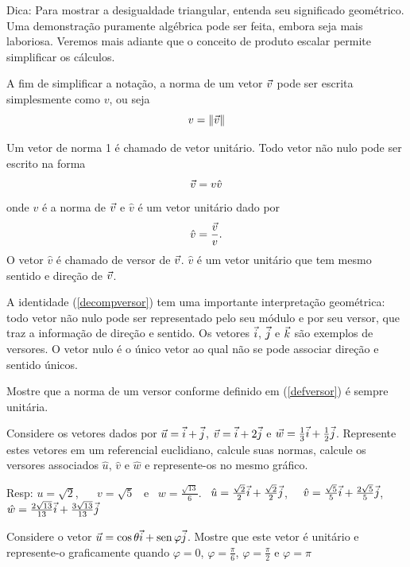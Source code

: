 Dica: Para mostrar a desigualdade triangular, entenda seu significado geométrico. Uma demonstração puramente algébrica pode ser feita, embora seja mais laboriosa. Veremos mais adiante que o conceito de produto escalar permite simplificar os cálculos. 

A fim de simplificar a notação, a norma de um vetor $\vec{v}$ pode ser escrita simplesmente como $v$, ou seja
$$v=\|\vec{v}\|$$ 

Um vetor de norma 1 é chamado de vetor unitário. Todo vetor não nulo pode ser escrito na forma
\begin{equation}\label{decompversor}\vec{v}=v \hat{v}\end{equation}
onde $v$ é a norma de $\vec{v}$ e $\hat{v}$ é um vetor unitário dado por
\begin{equation}\label{defversor}\hat{v}=\frac{\vec{v}}{v}.\end{equation}
O vetor $\hat{v}$ é chamado de versor de $\vec{v}$. $\hat{v}$ é um vetor unitário que tem mesmo sentido e direção de $\vec{v}$.

A identidade (\ref{decompversor}) tem uma importante interpretação geométrica: todo vetor não nulo pode ser representado pelo seu módulo e por seu versor, que traz a informação de direção e sentido.  Os vetores $\vec{i}$, $\vec{j}$ e $\vec{k}$ são exemplos de versores. O vetor nulo é o único vetor ao qual não se pode associar direção e sentido únicos.


\begin{exer}Mostre que a norma de um versor conforme definido em (\ref{defversor}) é sempre unitária. 
\end{exer}

\begin{exer}\label{ex1uvw} Considere os vetores dados por $\vec{u}=\vec{i}+\vec{j}$, $\vec{v}=\vec{i}+2\vec{j}$ e $\vec{w}=\frac{1}{3}\vec{i}+\frac{1}{2}\vec{j}$. Represente estes vetores em um referencial euclidiano, calcule suas normas, calcule os versores associados $\hat{u}$, $\hat{v}$ e $\hat{w}$ e represente-os no mesmo gráfico.  
\end{exer}
Resp: $u=\sqrt{2}$, ~~ $v=\sqrt{5}$ ~e~ $w=\frac{\sqrt{13}}{{6}}$.~ $\hat{u}=\frac{\sqrt{2}}{2}\vec{i}+\frac{\sqrt{2}}{2}\vec{j}$,~~  $\hat{v}=\frac{\sqrt{5}}{5}\vec{i}+\frac{2\sqrt{5}}{5}\vec{j}$,~~ $\hat{w}=\frac{2\sqrt{13}}{13}\vec{i}+\frac{3\sqrt{13}}{13}\vec{j}$

\begin{exer} Considere o vetor $\vec{u}=\cos\theta \vec{i}+ \operatorname{sen}\varphi \vec{j}$. Mostre que este vetor é unitário e represente-o graficamente quando $\varphi=0$, $\varphi=\frac{\pi}{6}$, $\varphi=\frac{\pi}{2}$ e $\varphi={\pi}$ 
\end{exer}

